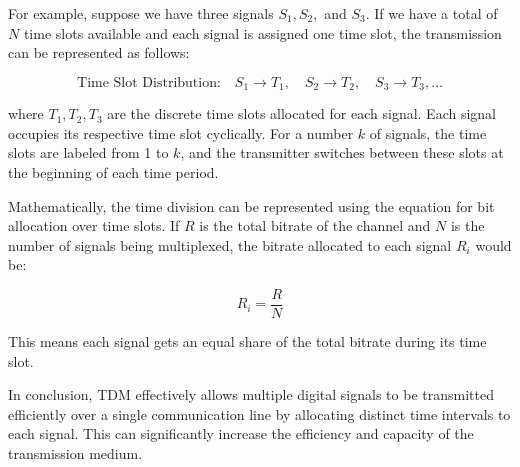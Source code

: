 For example, suppose we have three signals \( S_1, S_2, \) and \( S_3 \). If we have a total of \( N \) time slots available and each signal is assigned one time slot, the transmission can be represented as follows:

\[
\text{Time Slot Distribution:} \quad S_1 \rightarrow T_1, \quad S_2 \rightarrow T_2, \quad S_3 \rightarrow T_3, \ldots
\]

where \( T_1, T_2, T_3 \) are the discrete time slots allocated for each signal. Each signal occupies its respective time slot cyclically. For a number \( k \) of signals, the time slots are labeled from 1 to \( k \), and the transmitter switches between these slots at the beginning of each time period.

Mathematically, the time division can be represented using the equation for bit allocation over time slots. If \( R \) is the total bitrate of the channel and \( N \) is the number of signals being multiplexed, the bitrate allocated to each signal \( R_i \) would be:

\[
R_i = \frac{R}{N}
\]

This means each signal gets an equal share of the total bitrate during its time slot.

In conclusion, TDM effectively allows multiple digital signals to be transmitted efficiently over a single communication line by allocating distinct time intervals to each signal. This can significantly increase the efficiency and capacity of the transmission medium.

